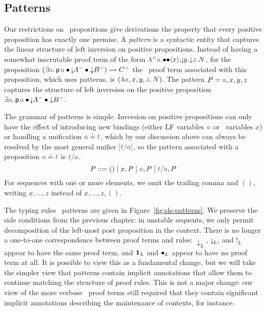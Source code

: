 \subsection{Patterns}
\label{sec:framework-patterns}

Our restrictions on \sls~propositions give derivations the property
that every positive proposition has exactly one premise. A {\it
  pattern} is a syntactic entity that captures the linear structure of
left inversion on positive propositions. Instead of having a somewhat
inscrutable proof term of the form
${\tlaml{\texistsl{\lf{a}}
   {\tfusel{\tfusel{\tetap{x}{\tgnabl{y}{\tdownl{z}{N}}}}}}}}$,
for the proposition 
%
$(\exists \lf{a}.\,{\sf p}\,\lf{a} 
             \fuse {\gnab}A^-
             \fuse {\downarrow}B^-) \lefti C^-$
%
the \sls~proof term associated with this proposition, which uses patterns, is
$(\lambda \lf{a},x,y,z.\, N)$. The pattern $P = \lf{a}, x,y,z$ captures
the structure of left inversion on the positive proposition 
$\exists \lf{a}.\,{\sf p}\,\lf{a} 
             \fuse {\gnab}A^-
             \fuse {\downarrow}B^-$.

The grammar of patterns is simple.
% 
Inversion on positive propositions
can only have the effect of introducing new bindings (either LF
variables $\lf{a}$ or \sls~variables $x$) or handling a unification
$\lf{a} \doteq \lf{t}$, which by our discussion above can always be
resolved by the most general unifier $\lf{[t/a]}$, so the pattern associated
with a proposition $\lf{a} \doteq \lf{t}$ is $\lf{t/a}$. 
\[
P ::= () \mid x, P \mid \lf{a}, P \mid \lf{t/a}, P
\] 
For sequences with one or more elements, we omit the trailing
comma and $()$, writing $x, \ldots, z$ 
instead of $x, \ldots, z, ()$. 

The typing rules \sls~patterns are given in
Figure~\ref{fig:sls-patterns}. We preserve the side conditions from
the previous chapter: in unstable sequents, we only permit
decomposition of the left-most post proposition in the context. There
is no longer a one-to-one correspondence between proof terms and
rules: ${\downarrow}_L$, ${\gnab}_L$, and ${!}_L$ appear to have the
same proof term, and ${\mathbf{1}}_L$ and ${\mathbin{\bullet}}_L$ appear to have no
proof term at all. It is possible to view this as a fundamental
change, but we will take the simpler view that patterns contain
implicit annotations that allow them to continue matching the
structure of proof rules. This is not a major change: our view of the
more verbose \ollll~proof terms still required that they contain
significant implicit annotations describing the maintenance of
contexts, for instance.


